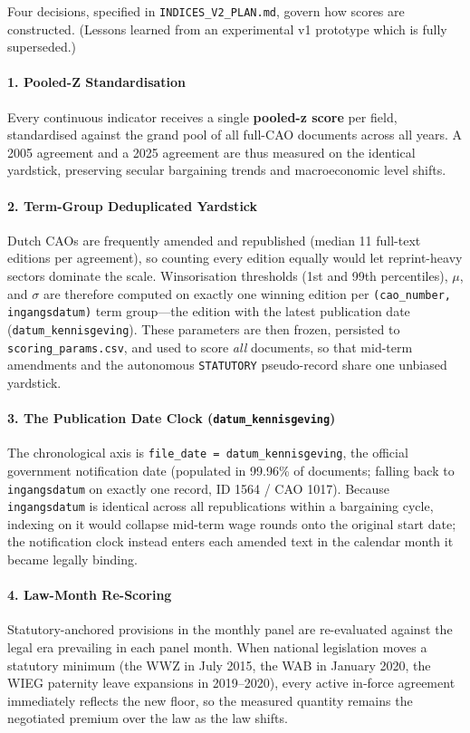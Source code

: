 Four decisions, specified in \nolinkurl{INDICES_V2_PLAN.md}, govern how scores are constructed. (Lessons learned from an experimental v1 prototype which is fully superseded.)

\paragraph{1. Pooled-Z Standardisation}
Every continuous indicator receives a single \textbf{pooled-z score} per field, standardised against the grand pool of all full-CAO documents across all years. A 2005 agreement and a 2025 agreement are thus measured on the identical yardstick, preserving secular bargaining trends and macroeconomic level shifts.

\paragraph{2. Term-Group Deduplicated Yardstick}
Dutch CAOs are frequently amended and republished (median 11 full-text editions per agreement), so counting every edition equally would let reprint-heavy sectors dominate the scale. Winsorisation thresholds (1st and 99th percentiles), $\mu$, and $\sigma$ are therefore computed on exactly one winning edition per \nolinkurl{(cao_number, ingangsdatum)} term group---the edition with the latest publication date (\nolinkurl{datum_kennisgeving}). These parameters are then frozen, persisted to \nolinkurl{scoring_params.csv}, and used to score \emph{all} documents, so that mid-term amendments and the autonomous \texttt{STATUTORY} pseudo-record share one unbiased yardstick.

\paragraph{3. The Publication Date Clock (\nolinkurl{datum_kennisgeving})}
The chronological axis is \nolinkurl{file_date = datum_kennisgeving}, the official government notification date (populated in 99.96\% of documents; falling back to \nolinkurl{ingangsdatum} on exactly one record, ID 1564 / CAO 1017). Because \nolinkurl{ingangsdatum} is identical across all republications within a bargaining cycle, indexing on it would collapse mid-term wage rounds onto the original start date; the notification clock instead enters each amended text in the calendar month it became legally binding.

\paragraph{4. Law-Month Re-Scoring}
Statutory-anchored provisions in the monthly panel are re-evaluated against the legal era prevailing in each panel month. When national legislation moves a statutory minimum (the WWZ in July 2015, the WAB in January 2020, the WIEG paternity leave expansions in 2019--2020), every active in-force agreement immediately reflects the new floor, so the measured quantity remains the negotiated premium over the law as the law shifts.

